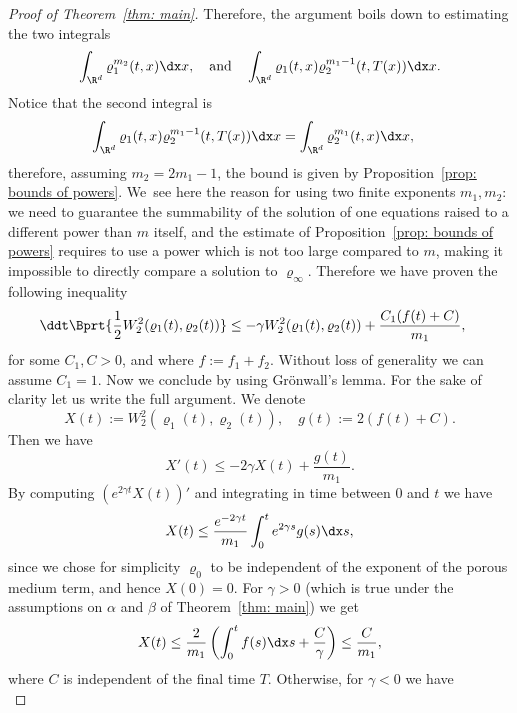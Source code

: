 \begin{proof}[Proof of Theorem~\ref{thm: main}]
Therefore, the argument boils down to estimating the two integrals
\begin{equation*}
\int_{\R^d} \varrho_1^{m_2}(t,x) \dx x, \quad \text{and} \quad \int_{\R^d} \varrho_1(t,x) \varrho_2^{m_1-1}(t,T(x)) \dx x.
\end{equation*}
Notice that the second integral is
\begin{align*}
\int_{\R^d} \varrho_1(t,x)\varrho_2^{m_1-1}(t,T(x)) \dx x &= \int_{\R^d} \varrho_2^{m_1}(t,x) \dx x,
\end{align*}
therefore, assuming $m_2=2m_1-1$, the bound is given by Proposition~\ref{prop: bounds of powers}. We~see here the reason for using two finite exponents $m_1,m_2$: we need to guarantee the summability of the solution of one equations raised to a different power than $m$ itself, and the estimate of Proposition~\ref{prop: bounds of powers} requires to use a power which is not too large compared to $m$, making it impossible to directly compare a solution to $\varrho_\infty$.
Therefore we have proven the following inequality
\begin{align*}\label{intermediate 2}
\ddt \Bprt{\frac 12 W_2^2(\varrho_1(t), \varrho_2(t))} &\leq - \gamma W_2^2(\varrho_1(t), \varrho_2(t))+ \frac{C_1(f(t) + C)}{m_1},
\end{align*}
for some $C_1, C>0$, and where $f:=f_1+f_2$. Without loss of generality we can assume $C_1=1$. Now we conclude by using Grönwall's lemma. For the sake of clarity let us write the full argument.
We denote
\[
X(t):= W_2^2(\varrho_1(t),\varrho_2(t)), \quad g(t):= {2}(f(t)+C).
\]
Then we have
\begin{equation*}
X'(t)\leq -2\gamma X(t) + \frac{g(t)}{m_1}.
\end{equation*}
By computing $(e^{2\gamma t}X(t))'$ and integrating in time between $0$ and $t$ we have
\begin{equation*}
X(t) \leq \frac{e^{-2\gamma t}}{m_1}\int_0^t e^{2\gamma s} g(s)\dx s,
\end{equation*}
since we chose for simplicity $\varrho_0$ to be independent of the exponent of the porous medium term, and hence $X(0)=0$. For $\gamma>0$ (which is true under the assumptions on $\alpha$ and $\beta$ of Theorem~\ref{thm: main}) we get
\begin{equation*}
X(t) \leq \frac{2}{m_1}\left(\int_0^t f(s)\dx s + \frac{C}{\gamma} \right)\leq \frac{C}{m_1},
\end{equation*}
where $C$ is independent of the final time $T$. Otherwise, for $\gamma<0$ we have
\begin{equation*}

\end{equation*}
\end{proof}
